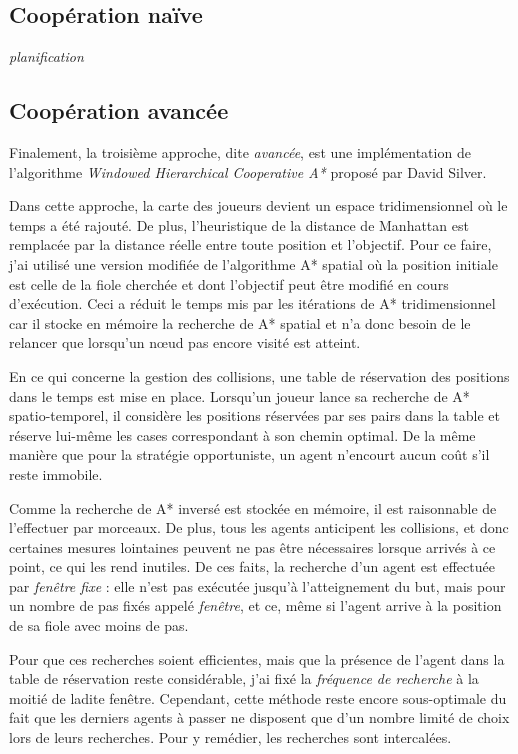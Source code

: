 \documentclass[letterpaper]{article}
\begin{document}
\subsection{Coop\'eration na\"ive}
\textit{planification}

\subsection{Coop\'eration avanc\'ee}
Finalement, la troisi\`eme approche, dite \textit{avanc\'ee}, est une impl\'ementation de l'algorithme \textit{Windowed Hierarchical Cooperative A*} propos\'e par David Silver. %

Dans cette approche, la carte des joueurs devient un espace tridimensionnel o\`u le temps a \'et\'e rajout\'e.
De plus, l'heuristique de la distance de Manhattan est remplac\'ee par la distance r\'eelle entre toute position et l'objectif.
Pour ce faire, j'ai utilis\'e une version modifi\'ee de l'algorithme A* spatial o\`u la position initiale est celle de la fiole cherch\'ee et dont l'objectif peut \^etre modifi\'e en cours d'ex\'ecution.
Ceci a r\'eduit le temps mis par les it\'erations de A* tridimensionnel car il stocke en m\'emoire la recherche de A* spatial et n'a donc besoin de le relancer que lorsqu'un n\oe ud pas encore visit\'e est atteint.

En ce qui concerne la gestion des collisions, une table de r\'eservation des positions  dans le temps est mise en place.
Lorsqu'un joueur lance sa recherche de A* spatio-temporel, il consid\`ere les positions r\'eserv\'ees par ses pairs dans la table et r\'eserve lui-m\^eme les cases correspondant \`a son chemin optimal.
De la m\^eme mani\`ere que pour la strat\'egie opportuniste, un agent n'encourt aucun co\^ut s'il reste immobile.

Comme la recherche de A* invers\'e est stock\'ee en m\'emoire, il est raisonnable de l'effectuer par morceaux.
De plus, tous les agents anticipent les collisions, et donc certaines mesures lointaines peuvent ne pas \^etre n\'ecessaires lorsque arriv\'es \`a ce point, ce qui les rend inutiles.
De ces faits, la recherche d'un agent est effectu\'ee par \textit{fen\^etre fixe} : elle n'est pas ex\'ecut\'ee jusqu'\`a l'atteignement du but, mais pour un nombre de pas fix\'es appel\'e \textit{fen\^etre}, et ce, m\^eme si l'agent arrive \`a la position de sa fiole avec moins de pas.

Pour que ces recherches soient efficientes, mais que la pr\'esence de l'agent dans la table de r\'eservation reste consid\'erable, j'ai fix\'e la \textit{fr\'equence de recherche} \`a la moiti\'e de ladite fen\^etre.
Cependant, cette m\'ethode reste encore sous-optimale du fait que les derniers agents \`a passer ne disposent que d'un nombre limit\'e de choix lors de leurs recherches.
Pour y rem\'edier, les recherches sont intercal\'ees. 
\end{document}
